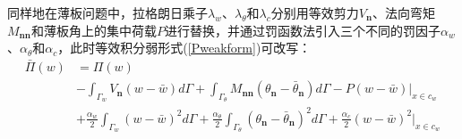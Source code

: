 同样地在薄板问题中，拉格朗日乘子$\lambda_w$、$\lambda_\theta$和$\lambda_c$分别用等效剪力$V_{\pmb n}$、法向弯矩$M_{\pmb{nn}}$和薄板角上的集中荷载$P$进行替换，并通过罚函数法引入三个不同的罚因子$\alpha_w$、$\alpha_\theta$和$\alpha_c$，此时等效积分弱形式(\ref{Pweakform})可改写：
\begin{equation}\label{Pnitsche}
\begin{split}
    \bar{\Pi}(w)&=\Pi(w)\\
    &-\int_{\Gamma_w}V_{\pmb{n}}(w-\bar{w})d\Gamma+\int_{\Gamma_{\theta}}M_{\pmb{nn}}(\theta_{\pmb{n}}-\bar{\theta}_{\pmb{n}})d\Gamma-P(w-\bar{w})\vert_{x\in c_w}\\
    &+\frac{\alpha_w}{2}\int_{\Gamma_w}(w-\bar{w})^2d\Gamma+\frac{\alpha_{\theta}}{2}\int_{\Gamma_{\theta}}(\theta_{\pmb{n}}-\bar{\theta}_{\pmb{n}})^2d\Gamma+\frac{\alpha_c}{2}(w-\bar{w})^2\vert_{x\in c_w}
\end{split}
\end{equation}
